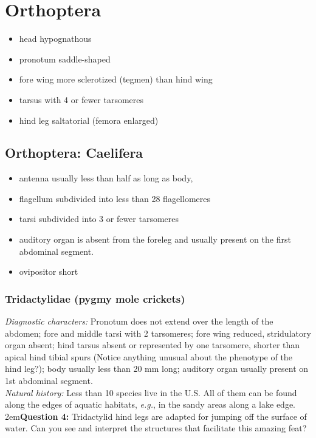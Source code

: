 \documentclass[letterpaper, 11pt]{article}
\begin{document}
\section{Orthoptera}
\begin{itemize}
\item head hypognathous
\item pronotum saddle-shaped
\item fore wing more sclerotized (tegmen) than hind wing
\item tarsus with 4 or fewer tarsomeres
\item hind leg saltatorial (femora enlarged)
\end{itemize}

\subsection{Orthoptera: Caelifera}
\begin{itemize}
\item antenna usually less than half as long as body, 
\item flagellum subdivided into less than 28 flagellomeres 
\item tarsi subdivided into 3 or fewer tarsomeres
\item auditory organ is absent from the foreleg and usually present on the first abdominal segment.
\item ovipositor short
\end{itemize}

\subsubsection{Tridactylidae (pygmy mole crickets)}
\noindent{}\textit{Diagnostic characters:} Pronotum does not extend over the length of the abdomen; fore and middle tarsi with 2 tarsomeres; fore wing reduced, stridulatory organ absent; hind tarsus absent or represented by one tarsomere, shorter than apical hind tibial spurs (Notice anything unusual about the phenotype of the hind leg?); body usually less than 20 mm long; auditory organ usually present on 1st abdominal segment.\\

\noindent{}\textit{Natural history:} Less than 10 species live in the U.S. All of them can be found along the edges of aquatic habitats, \textit{e.g.}, in the sandy areas along a lake edge. \\

\hangindent2em\textbf{Question 4:} Tridactylid hind legs are adapted for jumping off the surface of water. Can you see and interpret the structures that facilitate this amazing feat?\\
\end{document}
